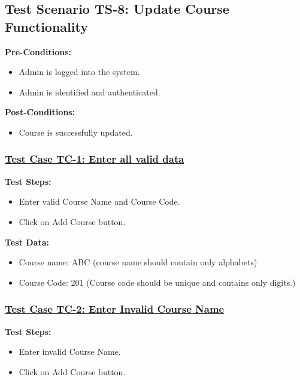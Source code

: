 \subsection{Test Scenario TS-8: Update Course Functionality}
\textbf{Pre-Conditions: } 
\begin{itemize}

\item Admin is logged into the system.
\item Admin is identified and authenticated.

\end{itemize}

\textbf{Post-Conditions: }
\begin{itemize}
\item Course is successfully updated.
\end{itemize}

\subsubsection{\underline{Test Case TC-1: Enter all valid data}}
\textbf{Test Steps:}
\begin{itemize}

\item Enter valid Course Name and Course Code.
\item Click on Add Course button.

\end{itemize}

\textbf{Test Data:}
\begin{itemize}

\item Course name: ABC (course name should contain only alphabets)
\item Course Code: 201 (Course code should be unique and contains only digits.)

\end{itemize}

\subsubsection{\underline{Test Case TC-2: Enter Invalid Course Name}}
\textbf{Test Steps:}
\begin{itemize}

\item Enter invalid Course Name.
\item Click on Add Course button.

\end{itemize}

